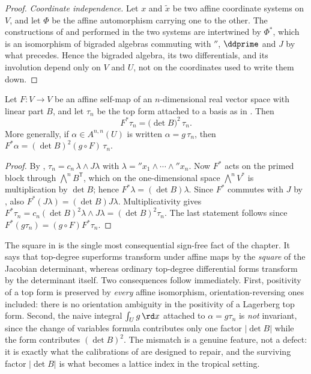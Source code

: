 \begin{proof}
\emph{Coordinate independence.}  Let $x$ and $\tilde x$ be two affine
coordinate systems on $V$, and let $\Phi$ be the affine automorphism carrying
one to the other.  The constructions of  and
 performed in the two systems are intertwined by
$\Phi^*$, which is an isomorphism of bigraded algebras commuting with
$\dprime$, $\ddprime$ and $J$ by what precedes.  Hence the bigraded algebra,
its two differentials, and its involution depend only on $V$ and $U$, not on
the coordinates used to write them down.
\end{proof}

\begin{proposition}
\label{prop:ch09-pullback-top}
Let $F:V\to V$ be an affine self-map of an $n$-dimensional real vector space
with linear part $B$, and let $\tau_n$ be the top form attached to a basis as
in .  Then
\[
 F^*\tau_n=\bigl(\det B\bigr)^2\,\tau_n .
\]
More generally, if $\alpha\in A^{n,n}(U)$ is written $\alpha=g\,\tau_n$, then
$F^*\alpha=(\det B)^2(g\circ F)\,\tau_n$.
\end{proposition}

\begin{proof}
By , $\tau_n=c_n\,\lambda\wedge J\lambda$ with
$\lambda=\dprime x_1\wedge\cdots\wedge\dprime x_n$.  Now $F^*$ acts on the
primed block through $\bigwedge^n B^{\mathsf T}$, which on the
one-dimensional space $\bigwedge^nV^*$ is multiplication by $\det B$; hence
$F^*\lambda=(\det B)\lambda$.  Since $F^*$ commutes with $J$ by
, also $F^*(J\lambda)=(\det B)J\lambda$.
Multiplicativity gives
$F^*\tau_n=c_n(\det B)^2\lambda\wedge J\lambda=(\det B)^2\tau_n$.  The last
statement follows since $F^*(g\tau_n)=(g\circ F)F^*\tau_n$.
\end{proof}

The square in  is the single most consequential
sign-free fact of the chapter.  It says that top-degree superforms transform
under affine maps by the \emph{square} of the Jacobian determinant, whereas
ordinary top-degree differential forms transform by the determinant itself.
Two consequences follow immediately.  First, positivity of a top form is
preserved by \emph{every} affine isomorphism, orientation-reversing ones
included: there is no orientation ambiguity in the positivity of a
Lagerberg top form.  Second, the naive integral
$\int_Ug\,\rd x$ attached to $\alpha=g\tau_n$ is \emph{not} invariant, since
the change of variables formula contributes only one factor $|\det B|$ while
the form contributes $(\det B)^2$.  The mismatch is a genuine feature, not a
defect: it is exactly what the calibrations of
 are designed to repair, and the surviving
factor $|\det B|$ is what becomes a lattice index in the tropical setting.

